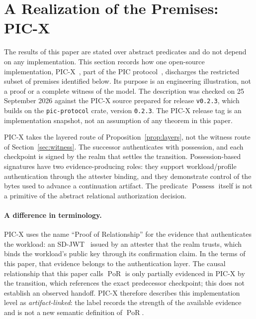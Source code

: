 \documentclass[10pt,twocolumn]{article}
\newcommand{\PoR}{\operatorname{PoR}}
\begin{document}
\section{A Realization of the Premises: PIC-X}
\label{sec:picx}

The results of this paper are stated over abstract predicates and do not depend
on any implementation. This section records how one open-source implementation,
PIC-X~\cite{picx}, part of the PIC protocol~\cite{picprotocol}, discharges the
restricted subset of premises identified below. Its purpose is an engineering
illustration, not a proof or a complete witness of the model. The description was checked on
25 September 2026 against the PIC-X source prepared for release
\texttt{v0.2.3}, which builds on the \texttt{pic-protocol} crate, version
\texttt{0.2.3}. The PIC-X release tag is an implementation snapshot, not an
assumption of any theorem in this paper.

PIC-X takes the layered route of Proposition~\ref{prop:layers}, not the witness
route of Section~\ref{sec:witness}. The successor authenticates with
possession, and each checkpoint is signed by the realm that settles the
transition. Possession-based signatures have two evidence-producing roles:
they support workload/profile authentication through the attester binding, and
they demonstrate control of the bytes used to advance a continuation artifact.
The predicate \(\operatorname{Possess}\) itself is not a primitive of the
abstract relational authorization decision.

\paragraph{A difference in terminology.}
PIC-X uses the name ``Proof of Relationship'' for the evidence that
authenticates the workload: an SD-JWT~\cite{sdjwt} issued by an attester that
the realm trusts, which binds the workload's public key through its
confirmation claim. In the terms of this paper, that evidence belongs to the
authentication layer. The causal relationship that this paper calls \(\PoR\) is
only partially evidenced in PIC-X by the transition, which references the exact
predecessor checkpoint; this does not establish an observed handoff.
PIC-X therefore describes this implementation level as \emph{artifact-linked}:
the label records the strength of the available evidence and is not a new
semantic definition of \(\PoR\).
\end{document}
